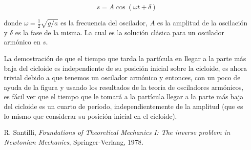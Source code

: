 \documentclass[a4paper,10pt]{article}
\numberwithin{equation}{section}
\begin{document}
\begin{equation}
 s = A\cos{(\omega t + \delta)}
\end{equation}

donde $\omega = \frac{1}{2}\sqrt{g/a}$ es la frecuencia del oscilador, $A$ es la 
amplitud de la oscilación y $\delta$ es la fase de la misma. La cual es la solución
clásica para un oscilador armónico en $s$.

\vspace{.3cm}

La demostración de que el tiempo que tarda la partícula en llegar a la parte más baja 
del cicloide es independiente de su posición inicial sobre la cicloide, es ahora 
trivial debido a que tenemos un oscilador armónico y entonces, con un poco de ayuda 
de la figura  y usando los resultados de la teoría de 
osciladores armónicos, es fácil ver que el tiempo que le tomará a la partícula 
llegar a la parte más baja del cicloide es un cuarto de período, independientemente de 
la amplitud (que es lo mismo que considerar su posición inicial en el cicloide).

\begin{thebibliography}{10}
  R. Santilli, \emph{Foundations of Theoretical Mechanics I: The inverse problem in 
  Newtonian Mechanics}, Springer-Verlang, 1978.
\end{thebibliography}
\end{document}
